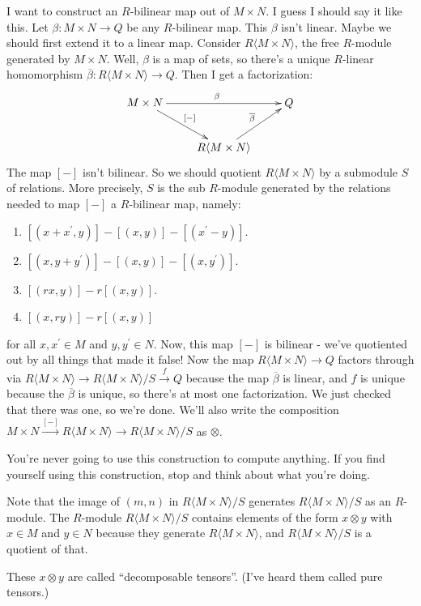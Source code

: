 \begin{construction}
I want to construct an $R$-bilinear map out of $M\times N$. I guess I should say it like this. Let $\beta:M\times N\to Q$ be any $R$-bilinear map. This $\beta$ isn't linear. Maybe we should first extend it to a linear map. Consider $R\langle M\times N\rangle$, the free $R$-module generated by $M\times N$. Well, $\beta$ is a map of sets, so there's a unique $R$-linear homomorphism $\overline{\beta}:R\langle M\times N\rangle\to Q$. Then I get a factorization:
\begin{equation*}
\xymatrix{M\times N\ar[rr]^\beta\ar[dr]^{[-]} & & Q\\
& R\langle M\times N\rangle\ar[ur]^{\overline{\beta}} &}
\end{equation*}
The map $[-]$ isn't bilinear. So we should quotient $R\langle M\times N\rangle$ by a submodule $S$ of relations. More precisely, $S$ is the sub $R$-module generated by the relations needed to map $[-]$ a $R$-bilinear map, namely:
\begin{enumerate}
\item $[(x+x^\prime,y)]-[(x,y)]-[(x^\prime-y)]$.
\item $[(x,y+y^\prime)]-[(x,y)]-[(x,y^\prime)]$.
\item $[(rx,y)]-r[(x,y)]$.
\item $[(x,ry)]-r[(x,y)]$
\end{enumerate}
for all $x,x^\prime\in M$ and $y,y^\prime\in N$. Now, this map $[-]$ is bilinear - we've quotiented out by all things that made it false! Now the map $R\langle M\times N\rangle\to Q$ factors through via $R\langle M\times N\rangle\to R\langle M\times N\rangle/S\xrightarrow{f} Q$ because the map $\overline{\beta}$ is linear, and $f$ is unique because the $\overline{\beta}$ is unique, so there's at most one factorization. We just checked that there was one, so we're done. We'll also write the composition $M\times N\xrightarrow{[-]}R\langle M\times N\rangle\to R\langle M\times N\rangle/S$ as $\otimes$.
\end{construction}
You're never going to use this construction to compute anything. If you find yourself using this construction, stop and think about what you're doing.
\begin{remark}
Note that the image of $(m,n)$ in $R\langle M\times N\rangle/S$ generates $R\langle M\times N\rangle/S$ as an $R$-module. The $R$-module $R\langle M\times N\rangle/S$ contains elements of the form $x\otimes y$ with $x\in M$ and $y\in N$ because they generate $R\langle M\times N\rangle$, and $R\langle M\times N\rangle/S$ is a quotient of that.

These $x\otimes y$ are called ``decomposable tensors''. (I've heard them called pure tensors.)
\end{remark}
